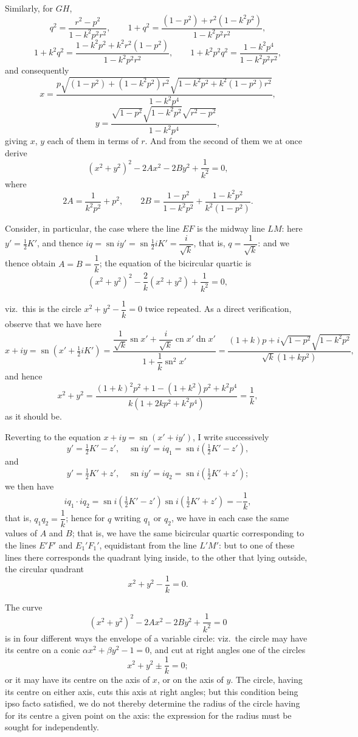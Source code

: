 \documentclass[11pt,a4paper]{article}
\providecommand{\sn}{\operatorname{sn}}
\providecommand{\cn}{\operatorname{cn}}
\providecommand{\dn}{\operatorname{dn}}
\begin{document}
Similarly, for $GH$,
\[
q^2 = \frac{r^2 - p^2}{1 - k^2 p^2 r^2}, \qquad 1 + q^2 = \frac{(1 - p^2) + r^2(1 - k^2 p^2)}{1 - k^2 p^2 r^2},
\]
\[
1 + k^2 q^2 = \frac{1 - k^2 p^2 + k^2 r^2(1 - p^2)}{1 - k^2 p^2 r^2}, \qquad 1 + k^2 p^2 q^2 = \frac{1 - k^2 p^4}{1 - k^2 p^2 r^2},
\]
and consequently
\[
x = \frac{p\sqrt{(1 - p^2) + (1 - k^2 p^2)r^2}\sqrt{1 - k^2 p^2 + k^2(1 - p^2)r^2}}{1 - k^2 p^4},
\]
\[
y = \frac{\sqrt{1 - p^2}\sqrt{1 - k^2 p^2}\sqrt{r^2 - p^2}}{1 - k^2 p^4},
\]
giving $x$, $y$ each of them in terms of $r$. And from the second of them we at once derive
\[
(x^2 + y^2)^2 - 2Ax^2 - 2By^2 + \frac{1}{k^2} = 0,
\]
where
\[
2A = \frac{1}{k^2 p^2} + p^2, \qquad 2B = \frac{1 - p^2}{1 - k^2 p^2} + \frac{1 - k^2 p^2}{k^2(1 - p^2)}.
\]

Consider, in particular, the case where the line $EF$ is the midway line $LM$: here $y' = \tfrac{1}{2}K'$, and thence $iq = \sn iy' = \sn \tfrac{1}{2}iK' = \dfrac{i}{\sqrt{k}}$, that is, $q = \dfrac{1}{\sqrt{k}}$: and we thence obtain $A = B = \dfrac{1}{k}$; the equation of the bicircular quartic is
\[
(x^2 + y^2)^2 - \frac{2}{k}(x^2 + y^2) + \frac{1}{k^2} = 0,
\]

\newpage

viz.\ this is the circle $x^2 + y^2 - \dfrac{1}{k} = 0$ twice repeated. As a direct verification, observe that we have here
\[
x + iy = \sn(x' + \tfrac{1}{2}iK') = \frac{\dfrac{1}{\sqrt{k}}\sn x' + \dfrac{i}{\sqrt{k}}\cn x' \dn x'}{1 + \dfrac{1}{k}\sn^2 x'} = \frac{(1 + k)p + i\sqrt{1 - p^2}\sqrt{1 - k^2 p^2}}{\sqrt{k}(1 + kp^2)},
\]
and hence
\[
x^2 + y^2 = \frac{(1 + k)^2 p^2 + 1 - (1 + k^2)p^2 + k^2 p^4}{k(1 + 2kp^2 + k^2 p^4)} = \frac{1}{k},
\]
as it should be.

\smallskip
Reverting to the equation $x + iy = \sn(x' + iy')$, I write successively
\[
y' = \tfrac{1}{2}K' - z',\quad \sn iy' = iq_1 = \sn i(\tfrac{1}{2}K' - z'),
\]
and
\[
y' = \tfrac{1}{2}K' + z',\quad \sn iy' = iq_2 = \sn i(\tfrac{1}{2}K' + z');
\]
we then have
\[
iq_1 \cdot iq_2 = \sn i(\tfrac{1}{2}K' - z')\sn i(\tfrac{1}{2}K' + z') = -\frac{1}{k},
\]
that is, $q_1 q_2 = \dfrac{1}{k}$; hence for $q$ writing $q_1$ or $q_2$, we have in each case the same values of $A$ and $B$; that is, we have the same bicircular quartic corresponding to the lines $E'F'$ and $E_1'F_1'$, equidistant from the line $L'M'$: but to one of these lines there corresponds the quadrant lying inside, to the other that lying outside, the circular quadrant
\[
x^2 + y^2 - \frac{1}{k} = 0.
\]

The curve
\[
(x^2 + y^2)^2 - 2Ax^2 - 2By^2 + \frac{1}{k^2} = 0
\]
is in four different ways the envelope of a variable circle: viz.\ the circle may have its centre on a conic $\alpha x^2 + \beta y^2 - 1 = 0$, and cut at right angles one of the circles
\[
x^2 + y^2 \pm \frac{1}{k} = 0;
\]
or it may have its centre on the axis of $x$, or on the axis of $y$. The circle, having its centre on either axis, cuts this axis at right angles; but this condition being ipso facto satisfied, we do not thereby determine the radius of the circle having for its centre a given point on the axis: the expression for the radius must be sought for independently.
\end{document}
